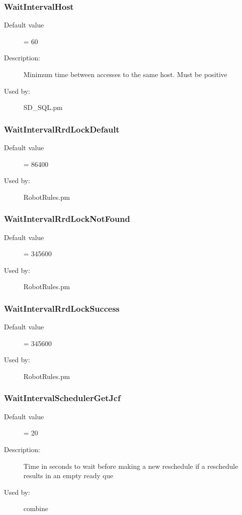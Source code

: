 \subsubsection{WaitIntervalHost}
\label{WaitIntervalHost}
\begin{description}
\item[Default value] = 60
\item[Description:] Minimum time between accesses to the same host. Must be positive
\item[Used by:] SD\_SQL.pm
\end{description}
\subsubsection{WaitIntervalRrdLockDefault}
\label{WaitIntervalRrdLockDefault}
\begin{description}
\item[Default value] = 86400
\item[Used by:] RobotRules.pm
\end{description}
\subsubsection{WaitIntervalRrdLockNotFound}
\label{WaitIntervalRrdLockNotFound}
\begin{description}
\item[Default value] = 345600
\item[Used by:] RobotRules.pm
\end{description}
\subsubsection{WaitIntervalRrdLockSuccess}
\label{WaitIntervalRrdLockSuccess}
\begin{description}
\item[Default value] = 345600
\item[Used by:] RobotRules.pm
\end{description}
\subsubsection{WaitIntervalSchedulerGetJcf}
\label{WaitIntervalSchedulerGetJcf}
\begin{description}
\item[Default value] = 20
\item[Description:] Time in seconds to wait before making a new reschedule if a reschedule results in an empty ready que
\item[Used by:] combine
\end{description}
